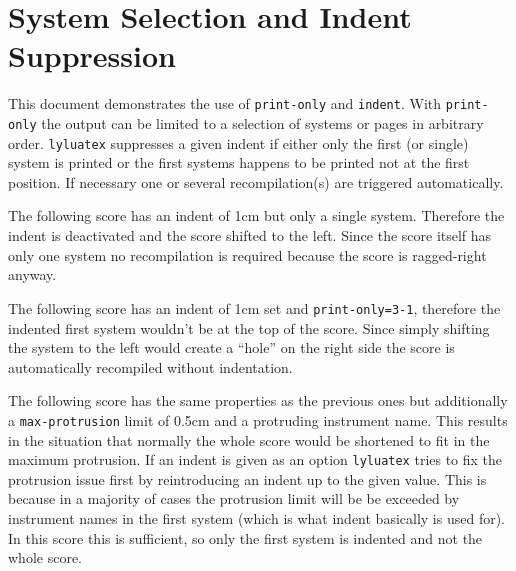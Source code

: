 \documentclass{scrartcl}
\begin{document}
\section*{System Selection and Indent Suppression}

This document demonstrates the use of \texttt{print-only} and \texttt{indent}.
With \texttt{print-only} the output can be limited to a selection of systems or
pages in arbitrary order.  \texttt{lyluatex} suppresses a given indent if either
only the first (or single) system is printed or the first systems happens to be
printed not at the first position.  If necessary one or several recompilation(s)
are triggered automatically.

\bigskip The following score has an indent of 1cm but only a single system.
Therefore the indent is deactivated and the score shifted to the left.  Since
the score itself has only one system no recompilation is required because the
score is ragged-right anyway.


The following score has an indent of 1cm set and \texttt{print-only=3-1},
therefore the indented first system wouldn't be at the top of the score. Since
simply shifting the system to the left would create a “hole” on the right side
the score is automatically recompiled without indentation.


The following score has the same properties as the previous ones but
additionally a \texttt{max-protrusion} limit of 0.5cm and a protruding
instrument name.  This results in the situation that normally the whole score
would be shortened to fit in the maximum protrusion.
If an indent is given as an option \texttt{lyluatex} tries to fix the protrusion
issue first by reintroducing an indent up to the given value.  This is because
in a majority of cases the protrusion limit will be be exceeded by instrument
names in the first system (which is what indent basically is used for).  In
this score this is sufficient, so only the first system is indented and not the
whole score.

\end{document}
